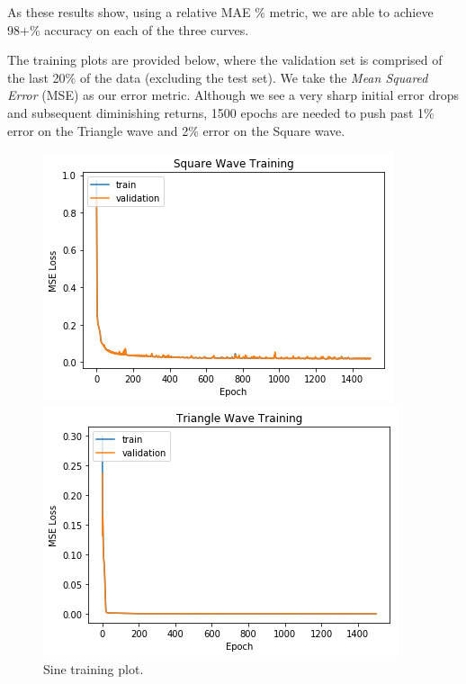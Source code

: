 \documentclass[letterpaper, 10 pt, conference]{ieeeconf}  %
\begin{document}
As these results show, using a relative MAE \% metric, we are able to achieve 98+\% accuracy on each of the three curves.

The training plots are provided below, where the validation set is comprised of the last 20\% of the data (excluding the test set). We take the \textit{Mean Squared Error} (MSE) as our error metric. Although we see a very sharp initial error drops and subsequent diminishing returns, 1500 epochs are needed to push past 1\% error on the Triangle wave and 2\% error on the Square wave.  

\begin{figure}[!tbp]
  \centering
  \begin{minipage}[b]{0.4\textwidth}
    \includegraphics[width=\textwidth]{assets/sine_training_plot.png}
    \caption{Sine training plot.}
  \end{minipage}
  \hfill
  \begin{minipage}[b]{0.4\textwidth}
    \includegraphics[width=\textwidth]{assets/triangle_training_plot.png}

\end{minipage}
\end{figure}
\end{document}
